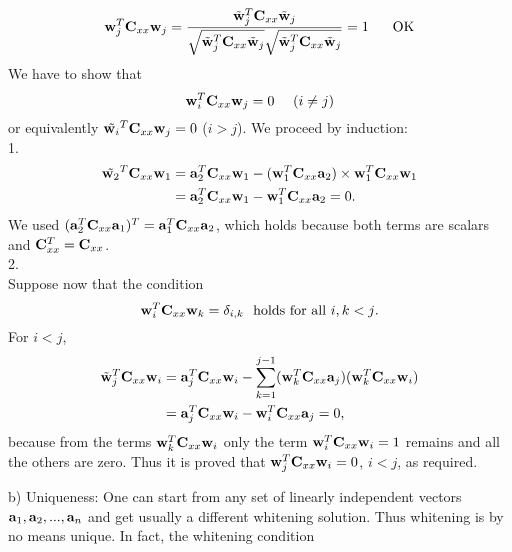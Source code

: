\documentclass[10pt]{article}
\begin{document}
\begin{enumerate}
\[
\mathbf{w}_j^T\mathbf{C}_{xx}\mathbf{w}_j
=\frac{\tilde{\mathbf{w}}_j^T\mathbf{C}_{xx}\tilde{\mathbf{w}}_j}{\sqrt{\tilde{\mathbf{w}}_j^T\mathbf{C}_{xx}\tilde{\mathbf{w}}_j}\sqrt{\tilde{\mathbf{w}}_j^T\mathbf{C}_{xx}\tilde{\mathbf{w}}_j}}
= 1 \hspace{6mm} \text{OK}
\]
%
We have to show that
\begin{equation*}
\mathbf{w}_i^T  \mathbf{C}_{xx} \mathbf{w}_j  = 0 \mbox{\ \ \ \ $(i \neq j)$}
\end{equation*}
or equivalently $\tilde{\mathbf{w}_i}^T \mathbf{C}_{xx} \mathbf{w}_j  = 0$ ($i > j$).
   We proceed by induction:
\vspace{2mm}\\
1.\\
\begin{align*}
\tilde{\mathbf{w}_2}^T \mathbf{C}_{xx} \mathbf{w}_1 &= 
\mathbf{a}_2^T \mathbf{C}_{xx} \mathbf{w}_1 - ( \mathbf{w}_1^T \mathbf{C}_{xx} \mathbf{a}_2 ) \times 
\mathbf{w}_1^T \mathbf{C}_{xx} \mathbf{w}_1 \nonumber \\
&= \mathbf{a}_2^T \mathbf{C}_{xx} \mathbf{w}_1
- \mathbf{w}_1^T \mathbf{C}_{xx} \mathbf{a}_2
 = 0 \mbox{.}
\end{align*}
%
We used $( \mathbf{a}_2^T \mathbf{C}_{xx} \mathbf{a}_1 )^T = \mathbf{a}_1^T \mathbf{C}_{xx} \mathbf{a}_2$, which holds
because both terms are scalars and $\mathbf{C}_{xx}^T = \mathbf{C}_{xx}$.
\vspace{2mm}\\
2.\\
\vspace{2mm}
%
%
Suppose now that the condition
\begin{equation*}
\mathbf{w}_i^T \mathbf{C}_{xx} \mathbf{w}_k = \delta_{i,k} \mbox{\ \ holds for all $i,k < j$.}
\end{equation*}
%
For $i < j$,
\begin{align*}
\tilde{\mathbf{w}}_j^T \mathbf{C}_{xx} \mathbf{w}_i &= \mathbf{a}_j^T \mathbf{C}_{xx} \mathbf{w}_i - \sum_{k=1}^{j-1} 
( \mathbf{w}_k^T \mathbf{C}_{xx} \mathbf{a}_j ) ( \mathbf{w}_k^T \mathbf{C}_{xx} \mathbf{w}_i ) \nonumber \\
&=  \mathbf{a}_j^T \mathbf{C}_{xx} \mathbf{w}_i - \mathbf{w}_i^T \mathbf{C}_{xx} \mathbf{a}_j = 0 \mbox{,}
\end{align*}
because from the terms $\mathbf{w}_k^T \mathbf{C}_{xx} \mathbf{w}_i$ only the term
$\mathbf{w}_i^T \mathbf{C}_{xx} \mathbf{w}_i = 1$ remains and all the others are zero.
Thus it is proved that $\mathbf{w}_j^T \mathbf{C}_{xx} \mathbf{w}_i = 0$, $i < j$, as required.

b) Uniqueness: One can start from any set of linearly independent vectors
$\mathbf{a}_1, \mathbf{a}_2, ..., \mathbf{a}_n$ and get usually a different whitening
solution. Thus whitening is by no means unique. In fact, the whitening
condition


\end{enumerate}
\end{document}
